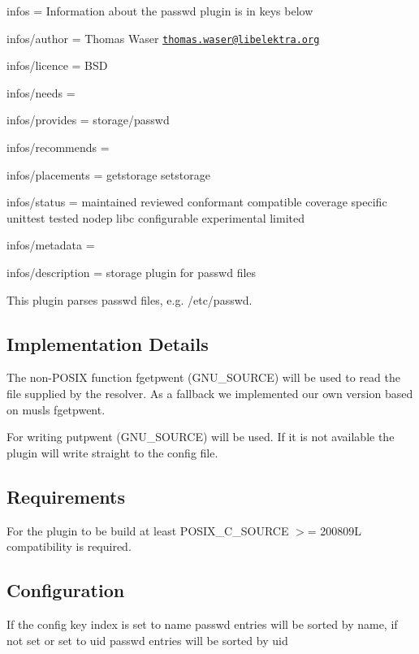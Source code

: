 
\begin{DoxyItemize}
\item infos = Information about the passwd plugin is in keys below
\item infos/author = Thomas Waser \href{mailto:thomas.waser@libelektra.org}{\tt thomas.\+waser@libelektra.\+org}
\item infos/licence = B\+SD
\item infos/needs =
\item infos/provides = storage/passwd
\item infos/recommends =
\item infos/placements = getstorage setstorage
\item infos/status = maintained reviewed conformant compatible coverage specific unittest tested nodep libc configurable experimental limited
\item infos/metadata =
\item infos/description = storage plugin for passwd files
\end{DoxyItemize}

This plugin parses {\ttfamily passwd} files, e.\+g. {\ttfamily /etc/passwd}.

\subsection*{Implementation Details}

The non-\/\+P\+O\+S\+IX function {\ttfamily fgetpwent} (G\+N\+U\+\_\+\+S\+O\+U\+R\+CE) will be used to read the file supplied by the resolver. As a fallback we implemented our own version based on musls {\ttfamily fgetpwent}.

For writing {\ttfamily putpwent} (G\+N\+U\+\_\+\+S\+O\+U\+R\+CE) will be used. If it is not available the plugin will write straight to the config file.

\subsection*{Requirements}

For the plugin to be build at least {\ttfamily P\+O\+S\+I\+X\+\_\+\+C\+\_\+\+S\+O\+U\+R\+CE $>$= 200809L} compatibility is required.

\subsection*{Configuration}

If the config key {\ttfamily index} is set to {\ttfamily name} passwd entries will be sorted by name, if not set or set to {\ttfamily uid} passwd entries will be sorted by uid

